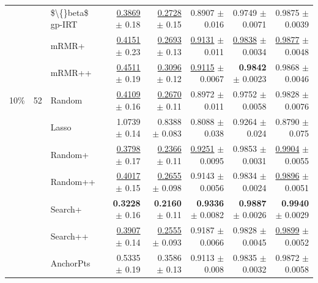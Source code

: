 \begin{longtable}{llp{}rrrrr}
 &  & \$\textbackslash\{\}beta\$ gp-IRT & \underline{0.3869} {\scriptsize $\pm$ 0.18} & \underline{0.2728} {\scriptsize $\pm$ 0.15} & 0.8907 {\scriptsize $\pm$ 0.016} & 0.9749 {\scriptsize $\pm$ 0.0071} & 0.9875 {\scriptsize $\pm$ 0.0039} \\
 &  & mRMR+ & \underline{0.4151} {\scriptsize $\pm$ 0.23} & \underline{0.2693} {\scriptsize $\pm$ 0.13} & \underline{0.9131} {\scriptsize $\pm$ 0.011} & \underline{0.9838} {\scriptsize $\pm$ 0.0034} & \underline{0.9877} {\scriptsize $\pm$ 0.0048} \\
 &  & mRMR++ & \underline{0.4511} {\scriptsize $\pm$ 0.19} & \underline{0.3096} {\scriptsize $\pm$ 0.12} & \underline{0.9115} {\scriptsize $\pm$ 0.0067} & \textbf{0.9842} {\scriptsize $\pm$ 0.0023} & 0.9868 {\scriptsize $\pm$ 0.0046} \\
\midrule
10\% & 52 & Random & \underline{0.4109} {\scriptsize $\pm$ 0.16} & \underline{0.2670} {\scriptsize $\pm$ 0.11} & 0.8972 {\scriptsize $\pm$ 0.011} & 0.9752 {\scriptsize $\pm$ 0.0058} & 0.9828 {\scriptsize $\pm$ 0.0076} \\
 &  & Lasso & 1.0739 {\scriptsize $\pm$ 0.14} & 0.8388 {\scriptsize $\pm$ 0.083} & 0.8088 {\scriptsize $\pm$ 0.038} & 0.9264 {\scriptsize $\pm$ 0.024} & 0.8790 {\scriptsize $\pm$ 0.075} \\
 &  & Random+ & \underline{0.3798} {\scriptsize $\pm$ 0.17} & \underline{0.2366} {\scriptsize $\pm$ 0.11} & \underline{0.9251} {\scriptsize $\pm$ 0.0095} & 0.9853 {\scriptsize $\pm$ 0.0031} & \underline{0.9904} {\scriptsize $\pm$ 0.0055} \\
 &  & Random++ & \underline{0.4017} {\scriptsize $\pm$ 0.15} & \underline{0.2655} {\scriptsize $\pm$ 0.098} & 0.9143 {\scriptsize $\pm$ 0.0056} & 0.9834 {\scriptsize $\pm$ 0.0024} & \underline{0.9896} {\scriptsize $\pm$ 0.0051} \\
 &  & Search+ & \textbf{0.3228} {\scriptsize $\pm$ 0.16} & \textbf{0.2160} {\scriptsize $\pm$ 0.11} & \textbf{0.9336} {\scriptsize $\pm$ 0.0082} & \textbf{0.9887} {\scriptsize $\pm$ 0.0026} & \textbf{0.9940} {\scriptsize $\pm$ 0.0029} \\
 &  & Search++ & \underline{0.3907} {\scriptsize $\pm$ 0.14} & \underline{0.2555} {\scriptsize $\pm$ 0.093} & 0.9187 {\scriptsize $\pm$ 0.0066} & 0.9828 {\scriptsize $\pm$ 0.0045} & \underline{0.9899} {\scriptsize $\pm$ 0.0052} \\
 &  & AnchorPts & 0.5335 {\scriptsize $\pm$ 0.19} & 0.3586 {\scriptsize $\pm$ 0.13} & 0.9113 {\scriptsize $\pm$ 0.008} & 0.9835 {\scriptsize $\pm$ 0.0032} & 0.9872 {\scriptsize $\pm$ 0.0058} \\

\end{longtable}
